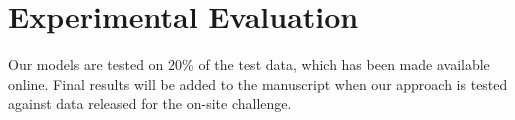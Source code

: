 \section{Experimental Evaluation}
Our models are tested on $20\%$ of the test data, which has been made available online. 
Final results will be added to the manuscript when our approach is tested against data released for the on-site challenge.